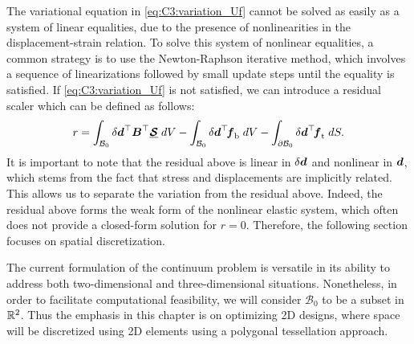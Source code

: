The variational equation in \eqref{eq:C3:variation_Uf} cannot be solved as easily as a system of linear equalities, due to the presence of nonlinearities in the displacement-strain relation. To solve this system of nonlinear equalities, a common strategy is to use the Newton-Raphson iterative method, which involves a sequence of linearizations followed by small update steps until the equality is satisfied. If \eqref{eq:C3:variation_Uf} is not satisfied, we can introduce a residual scaler which can be defined as follows:
%
\begin{equation}
r = \int_{\mathcal{B}_0} \delta {\boldsymbol{d}}^\top {\boldsymbol{B}}^\top \underline{\boldsymbol{\mathcal{S}}}\; dV - \int_{\mathcal{B}_0}  \delta {\boldsymbol{d}}^\top \! {\boldsymbol{f}}_{\textrm{b}} \; dV - \int_{\partial \mathcal{B}_0}  \delta {\boldsymbol{d}}^\top \! {\boldsymbol{f}}_{\textrm{t}}  \; dS.
\label{eq:C3:residual_scalar}
\end{equation}
%
It is important to note that the residual above is linear in $\delta {\boldsymbol{d}}$ and nonlinear in ${\boldsymbol{d}}$, which stems from the fact that stress and displacements are implicitly related. This allows us to separate the variation from the residual above. Indeed, the residual above forms the weak form of the nonlinear elastic system, which often does not provide a closed-form solution for $r = 0$. Therefore, the following section focuses on spatial discretization.

\begin{rmk}
The current formulation of the continuum problem is versatile in its ability to address both two-dimensional and three-dimensional situations. Nonetheless, in order to facilitate computational feasibility, we will consider $\mathcal{B}_0$ to be a subset in $\mathbb{R}^2$. Thus the emphasis in this chapter is on optimizing 2D designs, where space will be discretized using 2D elements using a polygonal tessellation approach.
\end{rmk}




